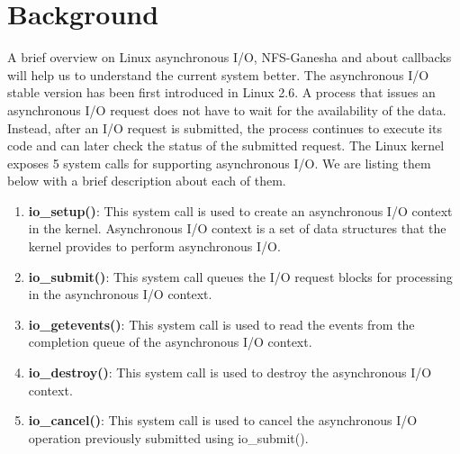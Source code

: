 \section{Background}
\label{bg}

A brief overview on Linux asynchronous I/O, NFS-Ganesha and about callbacks will help us to understand the current system better. The asynchronous I/O stable version has been first introduced in Linux 2.6. A process that issues an asynchronous I/O request does not have to wait for the availability of the data. Instead, after an I/O request is submitted, the process continues to execute its code and can later check the status of the submitted request. The Linux kernel exposes 5 system calls \cite{kernelCode} for supporting asynchronous I/O. We are listing them below with a brief description about each of them.

\begin{enumerate}

\item{\textbf{io\_setup()}: This system call is used to create an asynchronous I/O context in the kernel. Asynchronous I/O context is a set of data structures that the kernel provides to perform asynchronous I/O.}

\item{\textbf{io\_submit()}: This system call queues the I/O request blocks for processing in the asynchronous I/O context.}

\item{\textbf{io\_getevents()}: This system call is used to read the events from the completion queue of the asynchronous I/O context.}

\item{\textbf{io\_destroy()}: This system call is used to destroy the asynchronous I/O context.}

\item{\textbf{io\_cancel()}: This system call is used to cancel the asynchronous I/O operation previously submitted using io\_submit().}

\end{enumerate}


